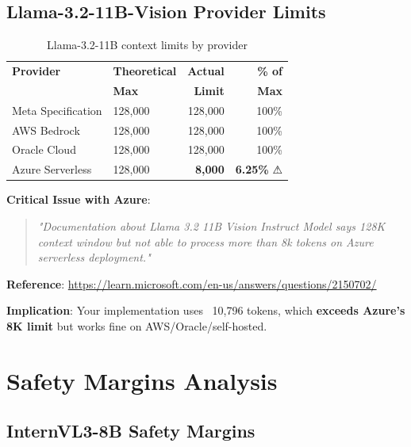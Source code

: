 \documentclass[11pt,a4paper]{article}
\begin{document}
\subsection{Llama-3.2-11B-Vision Provider Limits}

\begin{table}[h]
\centering
\begin{tabular}{llrr}
\toprule
\textbf{Provider} & \textbf{Theoretical} & \textbf{Actual} & \textbf{\% of} \\
& \textbf{Max} & \textbf{Limit} & \textbf{Max} \\
\midrule
Meta Specification & 128,000 & 128,000 & 100\% \\
AWS Bedrock & 128,000 & 128,000 & 100\% \\
Oracle Cloud & 128,000 & 128,000 & 100\% \\
Azure Serverless & 128,000 & \textbf{8,000} & \textbf{6.25\%} ⚠ \\
\bottomrule
\end{tabular}
\caption{Llama-3.2-11B context limits by provider}
\end{table}

\textbf{Critical Issue with Azure}:
\begin{quote}
\textit{"Documentation about Llama 3.2 11B Vision Instruct Model says 128K context window but not able to process more than 8k tokens on Azure serverless deployment."}
\end{quote}

\textbf{Reference}: \url{https://learn.microsoft.com/en-us/answers/questions/2150702/}

\textbf{Implication}: Your implementation uses ~10,796 tokens, which \textbf{exceeds Azure's 8K limit} but works fine on AWS/Oracle/self-hosted.

\section{Safety Margins Analysis}

\subsection{InternVL3-8B Safety Margins}
\end{document}
